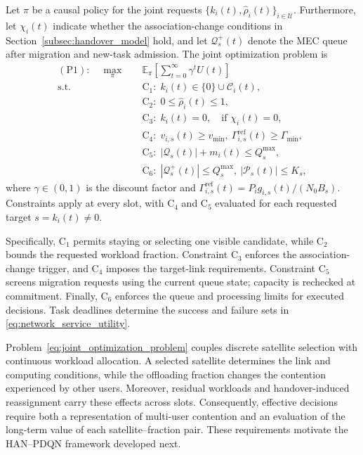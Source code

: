 \documentclass[journal]{IEEEtran}
\begin{document}
Let $\pi$ be a causal policy for the joint requests
$\{k_i(t),\widehat{\rho}_i(t)\}_{i\in\mathcal{U}}$.
Furthermore, let $\chi_i(t)$ indicate whether the
association-change conditions in
Section~\ref{subsec:handover_model} hold, and let
$\mathcal{Q}_s^{+}(t)$ denote the MEC queue after migration
and new-task admission.
The joint optimization problem is
\begin{equation}
\begin{aligned}
\mathrm{(P1)}:\quad
\max_{\pi}\quad&
\mathbb{E}_{\pi}
\left[\sum_{t=0}^{\infty}\gamma^t U(t)\right]\\
\mathrm{s.t.}\quad
&\mathrm{C}_1:\;
k_i(t)\in\{0\}\cup\mathcal{C}_i(t),\\
&\mathrm{C}_2:\;
0\leq\widehat{\rho}_i(t)\leq1,\\
&\mathrm{C}_3:\;
k_i(t)=0,\quad\text{if }\chi_i(t)=0,\\
&\mathrm{C}_4:\;
v_{i,s}(t)\geq v_{\min},\
\Gamma^{\mathrm{ref}}_{i,s}(t)\geq\Gamma_{\min},\\
&\mathrm{C}_5:\;
|\mathcal{Q}_s(t)|+m_i(t)\leq Q_s^{\max},\\
&\mathrm{C}_6:\;
|\mathcal{Q}_s^{+}(t)|\leq Q_s^{\max},\
|\mathcal{P}_s(t)|\leq K_s,
\end{aligned}
\label{eq:joint_optimization_problem}
\end{equation}
where $\gamma\in(0,1)$ is the discount factor and
$\Gamma^{\mathrm{ref}}_{i,s}(t)
=P_i g_{i,s}(t)/(N_0B_s)$.
Constraints apply at every slot, with
$\mathrm{C}_4$ and $\mathrm{C}_5$ evaluated for each
requested target $s=k_i(t)\neq0$.

Specifically, $\mathrm{C}_1$ permits staying or selecting
one visible candidate, while $\mathrm{C}_2$ bounds the
requested workload fraction.
Constraint $\mathrm{C}_3$ enforces the association-change
trigger, and $\mathrm{C}_4$ imposes the target-link
requirements.
Constraint $\mathrm{C}_5$ screens migration requests
using the current queue state; capacity is rechecked
at commitment.
Finally, $\mathrm{C}_6$ enforces the queue and processing
limits for executed decisions.
Task deadlines determine the success and failure sets
in \eqref{eq:network_service_utility}.

Problem~\eqref{eq:joint_optimization_problem} couples
discrete satellite selection with continuous workload
allocation. A selected satellite determines the link
and computing conditions, while the offloading fraction
changes the contention experienced by other users.
Moreover, residual workloads and handover-induced
reassignment carry these effects across slots.
Consequently, effective decisions require both a
representation of multi-user contention and an
evaluation of the long-term value of each
satellite--fraction pair. These requirements motivate
the HAN--PDQN framework developed next.
\end{document}

